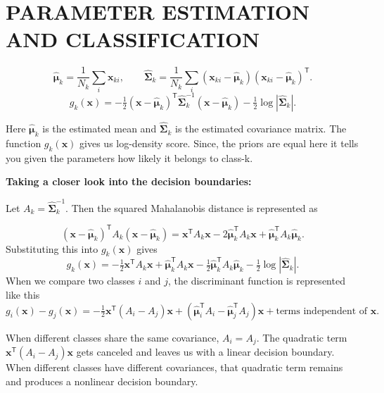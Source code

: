 \documentclass[11pt,a4paper]{article}
\begin{document}
\section*{PARAMETER ESTIMATION AND CLASSIFICATION}
\[
\hat{\boldsymbol\mu}_k=\frac{1}{N_k}\sum_i\mathbf{x}_{ki},\qquad
\hat{\boldsymbol\Sigma}_k=\frac{1}{N_k}\sum_i
(\mathbf{x}_{ki}-\hat{\boldsymbol\mu}_k)
(\mathbf{x}_{ki}-\hat{\boldsymbol\mu}_k)^{\mathsf T}.
\]
\[
g_k(\mathbf{x})=-\tfrac12(\mathbf{x}-\hat{\boldsymbol\mu}_k)^{\mathsf T}
\hat{\boldsymbol\Sigma}_k^{-1}(\mathbf{x}-\hat{\boldsymbol\mu}_k)
-\tfrac12\log|\hat{\boldsymbol\Sigma}_k|.
\]

Here $\hat{\boldsymbol\mu}_k$ is the estimated mean and $\hat{\boldsymbol\Sigma}_k$ is the estimated covariance matrix. The function $g_k(\mathbf{x})$ gives us log-density score. Since, the priors are equal here it tells you given the parameters how likely it belongs to class-k.

\textbf{Taking a closer look into the decision boundaries:}\par\medskip

Let $A_k=\hat{\boldsymbol\Sigma}_k^{-1}$. Then the squared Mahalanobis distance is represented as

\[
(\mathbf{x}-\hat{\boldsymbol\mu}_k)^{\mathsf T}A_k
(\mathbf{x}-\hat{\boldsymbol\mu}_k)
=\mathbf{x}^{\mathsf T}A_k\mathbf{x}
-2\hat{\boldsymbol\mu}_k^{\mathsf T}A_k\mathbf{x}
+\hat{\boldsymbol\mu}_k^{\mathsf T}A_k\hat{\boldsymbol\mu}_k.
\]
Substituting this into $g_k(\mathbf{x})$ gives
\[
g_k(\mathbf{x})=-\tfrac12\mathbf{x}^{\mathsf T}A_k\mathbf{x}
+\hat{\boldsymbol\mu}_k^{\mathsf T}A_k\mathbf{x}
-\tfrac12\hat{\boldsymbol\mu}_k^{\mathsf T}A_k\hat{\boldsymbol\mu}_k
-\tfrac12\log|\hat{\boldsymbol\Sigma}_k|.
\]
When we compare two classes $i$ and $j$, the discriminant function is represented like this
\[
g_i(\mathbf{x})-g_j(\mathbf{x})
=-\tfrac12\mathbf{x}^{\mathsf T}(A_i-A_j)\mathbf{x}
+(\hat{\boldsymbol\mu}_i^{\mathsf T}A_i
-\hat{\boldsymbol\mu}_j^{\mathsf T}A_j)\mathbf{x}
+\text{terms independent of }\mathbf{x}.
\]

When different classes share the same covariance, $A_i=A_j$. The quadratic term $\mathbf{x}^{\mathsf T}(A_i-A_j)\mathbf{x}$ gets canceled and leaves us with a linear decision boundary. When different classes have different covariances, that quadratic term remains and produces a nonlinear decision boundary.

\clearpage
\end{document}
